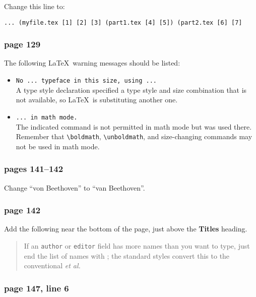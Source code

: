 Change this line to:
\begin{small}
\begin{verbatim}
... (myfile.tex [1] [2] [3] (part1.tex [4] [5]) (part2.tex [6] [7]
\end{verbatim}
\end{small}

\subsubsection*{page 129}

The following \LaTeX\ warning messages should be listed:
\begin{itemize}
\item[] {\tt No ... typeface in this size, using ...}\\
A type style declaration specified a type style and size combination
that is not available, so \LaTeX\ is substituting another one.

\item[] {\tt ... in math mode.}\\
The indicated command is not permitted in math mode but was used there.
Remember that \verb|\boldmath|, \verb|\unboldmath|, and size-changing
commands may not be used in math mode.
\end{itemize}


\subsubsection*{pages 141--142}

Change ``von Beethoven'' to ``van Beethoven''.


\subsubsection*{page 142}

Add the following near the bottom of the page, just above the
{\bf Titles} heading.
\begin{quote}
If an {\tt author} or {\tt editor} field has more names than you want to
type, just end the list of names with ; the standard styles convert this to the conventional {\em et
al.}
\end{quote}

\subsubsection*{page 147, line 6}

